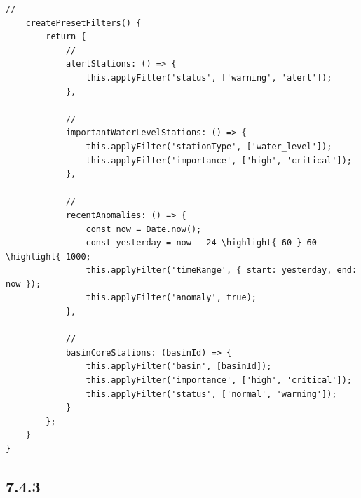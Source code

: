 \begin{lstlisting}[style=javascript]
    // 
    createPresetFilters() {
        return {
            // 
            alertStations: () => {
                this.applyFilter('status', ['warning', 'alert']);
            },
            
            // 
            importantWaterLevelStations: () => {
                this.applyFilter('stationType', ['water_level']);
                this.applyFilter('importance', ['high', 'critical']);
            },
            
            // 
            recentAnomalies: () => {
                const now = Date.now();
                const yesterday = now - 24 \highlight{ 60 } 60 \highlight{ 1000;
                this.applyFilter('timeRange', { start: yesterday, end: now });
                this.applyFilter('anomaly', true);
            },
            
            // 
            basinCoreStations: (basinId) => {
                this.applyFilter('basin', [basinId]);
                this.applyFilter('importance', ['high', 'critical']);
                this.applyFilter('status', ['normal', 'warning']);
            }
        };
    }
}
\end{lstlisting}

\hypertarget{section-172}{%
\subsection{7.4.3}\label{section-172}}

\hypertarget{section-173}{%
\subsubsection{}\label{section-173}}

